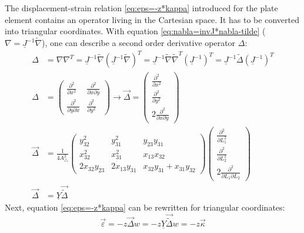   The displacement-strain relation \eqref{eq:eps=-z*kappa} introduced for the plate element contains an operator living in the Cartesian space. It has to be converted into triangular coordinates. With equation \eqref{eq:nabla=invJ*nabla-tilde} ($\nabla = \underline{J}^{-1}\tilde{\nabla}$), one can describe a second order derivative operator $\Delta$:
  \begin{align}
  \Delta &= \nabla \nabla^T = \underline{J}^{-1}\tilde{\nabla}\left(\underline{J}^{-1}\tilde{\nabla}\right)^T = \underline{J}^{-1} \tilde{\nabla} \tilde{\nabla}^T \left(\underline{J}^{-1}\right)^T = \underline{J}^{-1} \tilde{\Delta} \left(\underline{J}^{-1}\right)^T\\
  \Delta &= \begin{pmatrix}
  \frac{\partial^2}{\partial x^2} & \frac{\partial^2}{\partial x \partial y}\\
  \frac{\partial^2}{\partial y \partial x} & \frac{\partial^2}{\partial y^2}
  \end{pmatrix} \rightarrow \vec{\Delta} = \begin{pmatrix}
  \frac{\partial^2}{\partial x^2} \\
  \frac{\partial^2}{\partial y^2} \\
  2\frac{\partial^2}{\partial x \partial y}
  \end{pmatrix} \nonumber\\
  \vec{\Delta} &= \frac{1}{4 A_\triangle^2} \begin{pmatrix}
  y_{32}^2 & y_{31}^2 & y_{23} y_{31}\\
  x_{32}^2 & x_{31}^2 & x_{13} x_{32}\\
  2 x_{32} y_{23} & 2 x_{13} y_{31} & x_{32} y_{31} + x_{31} y_{32}
  \end{pmatrix} \begin{pmatrix}
  \frac{\partial^2}{\partial L_1^2} \\
  \frac{\partial^2}{\partial L_2^2} \\
  2\frac{\partial^2}{\partial L_1 \partial L_2}
  \end{pmatrix} \nonumber\\
  \vec{\Delta} &= \underline{Y} \vec{\tilde{\Delta}}
  \end{align}
  Next, equation \eqref{eq:eps=-z*kappa} can be rewritten for triangular coordinates:
  \begin{equation}
  \vec{\varepsilon} = -z \vec{\Delta} w = -z \underline{Y} \vec{\tilde{\Delta}} w = -z \vec{\kappa}
  \end{equation}
